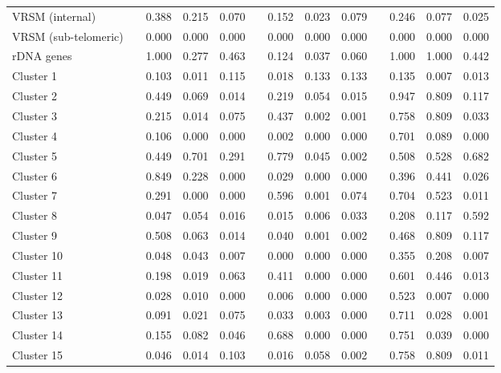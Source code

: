 \documentclass{article}
\newcommand{\gr}{\cellcolor[gray]{0.9}}
\begin{document}
\begin{table}
\begin{center}
\begin{tabular}{lcccccccccccc}
VRSM (internal) & & 0.388 & 0.215 & 0.070 & & 0.152 & \gr 0.023 & 0.079 & & 0.246 & 0.077 & \gr 0.025 \\
VRSM (sub-telomeric) & & \gr 0.000 & \gr 0.000 & \gr 0.000 & & \gr 0.000 & \gr 0.000 & \gr 0.000 & & \gr 0.000 & \gr 0.000 & \gr 0.000 \\
rDNA genes & & 1.000 & 0.277 & 0.463 & & 0.124 & \gr 0.037 & 0.060 & & 1.000 & 1.000 & 0.442 \\
Cluster 1 & & 0.103 & \gr 0.011 & 0.115 & & \gr 0.018 & 0.133 & 0.133 & & 0.135 & \gr 0.007 & \gr 0.013 \\
Cluster 2 & & 0.449 & 0.069 & \gr 0.014 & & 0.219 & 0.054 & \gr 0.015 & & 0.947 & 0.809 & 0.117 \\
Cluster 3 & & 0.215 & \gr 0.014 & 0.075 & & 0.437 & \gr 0.002 & \gr 0.001 & & 0.758 & 0.809 & \gr 0.033 \\
Cluster 4 & & 0.106 & \gr 0.000 & \gr 0.000 & & \gr 0.002 & \gr 0.000 & \gr 0.000 & & 0.701 & 0.089 & \gr 0.000 \\
Cluster 5 & & 0.449 & 0.701 & 0.291 & & 0.779 & \gr 0.045 & \gr 0.002 & & 0.508 & 0.528 & 0.682 \\
Cluster 6 & & 0.849 & 0.228 & \gr 0.000 & & \gr 0.029 & \gr 0.000 & \gr 0.000 & & 0.396 & 0.441 & \gr 0.026 \\
Cluster 7 & & 0.291 & \gr 0.000 & \gr 0.000 & & 0.596 & \gr 0.001 & 0.074 & & 0.704 & 0.523 & \gr 0.011 \\
Cluster 8 & & \gr 0.047 & 0.054 & \gr 0.016 & & \gr 0.015 & \gr 0.006 & \gr 0.033 & & 0.208 & 0.117 & 0.592 \\
Cluster 9 & & 0.508 & 0.063 & \gr 0.014 & & \gr 0.040 & \gr 0.001 & \gr 0.002 & & 0.468 & 0.809 & 0.117 \\
Cluster 10 & & \gr 0.048 & \gr 0.043 & \gr 0.007 & & \gr 0.000 & \gr 0.000 & \gr 0.000 & & 0.355 & 0.208 & \gr 0.007 \\
Cluster 11 & & 0.198 & \gr 0.019 & 0.063 & & 0.411 & \gr 0.000 & \gr 0.000 & & 0.601 & 0.446 & \gr 0.013 \\
Cluster 12 & & \gr 0.028 & \gr 0.010 & \gr 0.000 & & \gr 0.006 & \gr 0.000 & \gr 0.000 & & 0.523 & \gr 0.007 & \gr 0.000 \\
Cluster 13 & & 0.091 & \gr 0.021 & 0.075 & & \gr 0.033 & \gr 0.003 & \gr 0.000 & & 0.711 & \gr 0.028 & \gr 0.001 \\
Cluster 14 & & 0.155 & 0.082 & \gr 0.046 & & 0.688 & \gr 0.000 & \gr 0.000 & & 0.751 & \gr 0.039 & \gr 0.000 \\
Cluster 15 & & \gr 0.046 & \gr 0.014 & 0.103 & & \gr 0.016 & 0.058 & \gr 0.002 & & 0.758 & 0.809 & \gr 0.011 \\
\hline
\end{tabular}
\end{center}
\label{table:witten}
\end{table}
\clearpage
\end{document}

